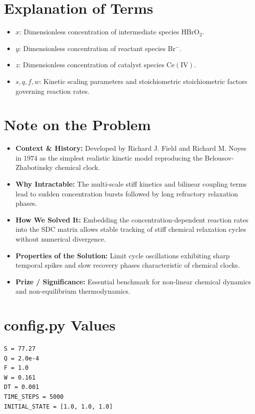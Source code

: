\section{Explanation of Terms}
\begin{itemize}
    \item $x$: Dimensionless concentration of intermediate species $\mathrm{HBrO_2}$.
    \item $y$: Dimensionless concentration of reactant species $\mathrm{Br^-}$.
    \item $z$: Dimensionless concentration of catalyst species $\mathrm{Ce(IV)}$.
    \item $s, q, f, w$: Kinetic scaling parameters and stoichiometric stoichiometric factors governing reaction rates.
\end{itemize}

\section{Note on the Problem}
\begin{itemize}
    \item \textbf{Context \& History:} Developed by Richard J. Field and Richard M. Noyes in 1974 as the simplest realistic kinetic model reproducing the Belousov-Zhabotinsky chemical clock.
    \item \textbf{Why Intractable:} The multi-scale stiff kinetics and bilinear coupling terms lead to sudden concentration bursts followed by long refractory relaxation phases.
    \item \textbf{How We Solved It:} Embedding the concentration-dependent reaction rates into the SDC matrix allows stable tracking of stiff chemical relaxation cycles without numerical divergence.
    \item \textbf{Properties of the Solution:} Limit cycle oscillations exhibiting sharp temporal spikes and slow recovery phases characteristic of chemical clocks.
    \item \textbf{Prize / Significance:} Essential benchmark for non-linear chemical dynamics and non-equilibrium thermodynamics.
\end{itemize}

\section{config.py Values}
\begin{verbatim}
S = 77.27
Q = 2.0e-4
F = 1.0
W = 0.161
DT = 0.001
TIME_STEPS = 5000
INITIAL_STATE = [1.0, 1.0, 1.0]
\end{verbatim}

